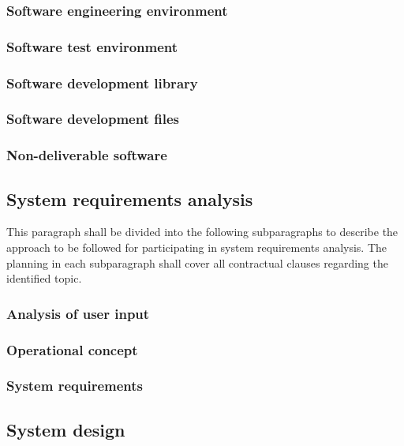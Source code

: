 \subsubsection{Software engineering environment}

\subsubsection{Software test environment}

\subsubsection{Software development library}

\subsubsection{Software development files}

\subsubsection{Non-deliverable software}

\subsection{System requirements analysis}

This paragraph shall be divided into the following subparagraphs to
describe the approach to be followed for participating in system
requirements analysis. The planning in each subparagraph shall cover all
contractual clauses regarding the identified topic.

\subsubsection{Analysis of user input}

\subsubsection{Operational concept}

\subsubsection{System requirements}

\subsection{System design}


